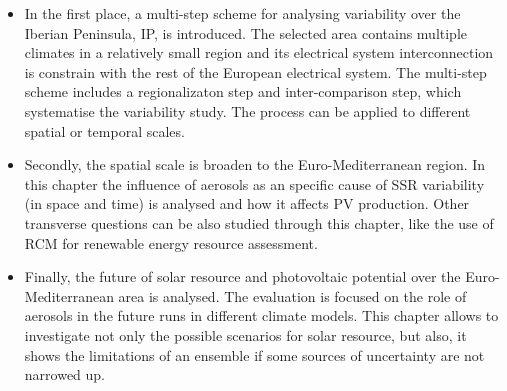 \begin{itemize}
\item In the first place, a multi-step scheme for analysing variability over the Iberian Peninsula, IP, is introduced. The selected area contains multiple climates in a relatively small region and its electrical system interconnection is constrain with the rest of the European electrical system. The multi-step scheme includes a regionalizaton step and inter-comparison step, which systematise the variability study. The process can be applied to different spatial or temporal scales.

\item Secondly, the spatial scale is broaden to the Euro-Mediterranean region. In this chapter the influence of aerosols as an specific cause of SSR variability (in space and time) is analysed and how it affects PV production. Other transverse questions can be also studied through this chapter, like the use of RCM for renewable energy resource assessment.

\item Finally, the future of solar resource and photovoltaic potential over the Euro-Mediterranean area is analysed. The evaluation is focused on the role of aerosols in the future runs in different climate models. This chapter allows to investigate not only the possible scenarios for solar resource, but also, it shows the limitations of an ensemble if some sources of uncertainty are not narrowed up.

\end{itemize}  





% 
